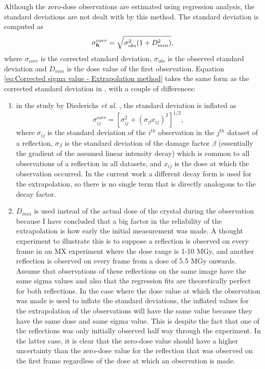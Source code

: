 Although the zero-dose observations are estimated using regression analysis, the standard deviations are not dealt with by this method.
The standard deviation is computed as
\begin{equation}
    \sigma^{corr}_{\boldsymbol{h}} = \sqrt{\sigma^2_{obs}(1 + D^2_{min})},
    \label{eq:Corrected sigma value - Extrapolation method}
\end{equation}
where $\sigma_{corr}$ is the corrected standard deviation, $\sigma_{obs}$ is the observed standard deviation and $D_{min}$ is the dose value of the first observation.
Equation \ref{eq:Corrected sigma value - Extrapolation method} takes the same form as the corrected standard deviation in \cite{diederichs2003}, with a couple of differences:
\begin{enumerate}
    \item in the study by Diederichs \textit{et al.} \cite{diederichs2003}, the standard deviation is inflated as
    \begin{equation}
        \sigma^{corr}_{ij} = \left[ \sigma^2_{ij} + (\sigma_{\beta}x_{ij})^2 \right]^{1/2},
    \end{equation}
    where $\sigma_{ij}$ is the standard deviation of the $i^{th}$ observation in the $j^{th}$ dataset of a reflection, $\sigma_{\beta}$ is the standard deviation of the damage factor $\beta$ (essentially the gradient of the assumed linear intensity decay) which is common to all observations of a reflection in all datasets, and $x_{ij}$ is the dose at which the observation occurred.
    In the current work a different decay form is used for the extrapolation, so there is no single term that is directly analogous to the decay factor.
    \item $D_{min}$ is used instead of the actual dose of the crystal during the observation because I have concluded that a big factor in the reliability of the extrapolation is how early the initial measurement was made.
    A thought experiment to illustrate this is to suppose a reflection is observed on every frame in an MX experiment where the dose range is 1-10 MGy, and another reflection is observed on every frame from a dose of 5.5 MGy onwards.
    Assume that observations of these reflections on the same image have the same sigma values and also that the regression fits are theoretically perfect for both reflections.
    In the case where the dose value at which the observation was made is used to inflate the standard deviations, the inflated values for the extrapolation of the observations will have the same value because they have the same dose and same sigma value.
    This is despite the fact that one of the reflections was only initially observed half way through the experiment.
    In the latter case, it is clear that the zero-dose value should have a higher uncertainty than the zero-dose value for the reflection that was observed on the first frame regardless of the dose at which an observation is made.
\end{enumerate}

